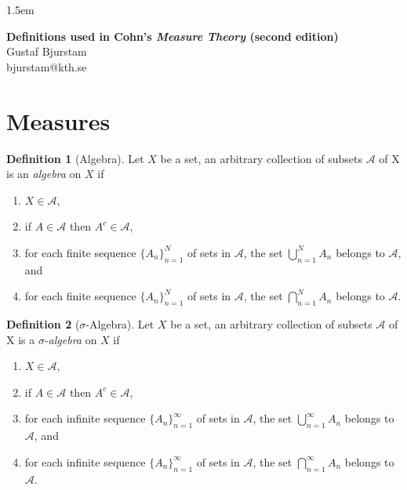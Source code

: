 \documentclass[12pt]{article}
\theoremstyle{definition}
\newtheorem{definition}{Definition}[section]
\newcommand{\algebra}{\mathscr{A}}
\begin{document}
\baselineskip 1.5em

\begin{center}
\textbf{\large Definitions used in Cohn's \textit{Measure Theory} (second edition)} \\
Gustaf Bjurstam\\
bjurstam@kth.se\\
\end{center}
\section{Measures}
\begin{definition}[Algebra]
    Let $X$ be a set, an arbitrary collection of subsets $\algebra$ of X is an \textit{algebra} on $X$ if
    \begin{enumerate}[label=(\alph*)]
        \item $X\in\algebra$,
        \item if $A\in\algebra$ then $A^c\in\algebra$,
        \item for each finite sequence $\{A_n\}_{n=1}^N$ of sets in $\algebra$, the set $\bigcup_{n=1}^N A_n$ belongs to $\algebra$, and
        \item for each finite sequence $\{A_n\}_{n=1}^N$ of sets in $\algebra$, the set $\bigcap_{n=1}^N A_n$ belongs to $\algebra$.
    \end{enumerate}
\end{definition}
\begin{definition}[$\sigma$-Algebra]
    Let $X$ be a set, an arbitrary collection of subsets $\algebra$ of X is a $\sigma$-\textit{algebra} on $X$ if
    \begin{enumerate}[label=(\alph*)]
        \item $X\in\algebra$,
        \item if $A\in\algebra$ then $A^c\in\algebra$,
        \item for each infinite sequence $\{A_n\}_{n=1}^\infty$ of sets in $\algebra$, the set $\bigcup_{n=1}^\infty A_n$ belongs to $\algebra$, and
        \item for each infinite sequence $\{A_n\}_{n=1}^\infty$ of sets in $\algebra$, the set $\bigcap_{n=1}^\infty A_n$ belongs to $\algebra$.
    \end{enumerate}
\end{definition}
\end{document}

